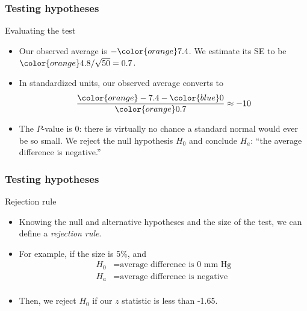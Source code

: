 \documentclass[handout]{beamer}
\begin{document}

   \begin{frame} \frametitle{Testing hypotheses}

   \begin{block}
   {Evaluating  the test}
   \begin{itemize}

   \item Our observed average is ${-\color{orange} 7.4}$. We estimate its SE
   to be ${\color{orange} 4.8 / \sqrt{50}=0.7}$.

    \item In standardized units, our observed average converts to
    $$
    \frac{{\color{orange}-7.4} - {\color{blue} 0}}{\color{orange} 0.7} \approx - 10
    $$

   \item The {\color{orange} $P$-value} is 0: there is virtually no chance
   a standard normal would ever be so small. We reject the null hypothesis $H_0$
   and conclude $H_a$: ``the average difference is negative.''


   \end{itemize}
   \end{block}
   \end{frame}


   \begin{frame} \frametitle{Testing hypotheses}

   \begin{block}
   {Rejection rule}
   \begin{itemize}

   \item Knowing the null and alternative hypotheses and the size of the test,
   we can define a {\em \color{blue} rejection rule}.

   \item For example, if the size is 5\%, and
   $$
   \begin{aligned}
     H_0 &= \text{average difference is 0 mm Hg} \\
     H_a &= \text{average difference is negative} \\
   \end{aligned}
   $$
   \item Then, we reject $H_0$ if our $z$ statistic is
   less than {\color{blue} -1.65}.

   \end{itemize}
   \end{block}
   \end{frame}
\end{document}
